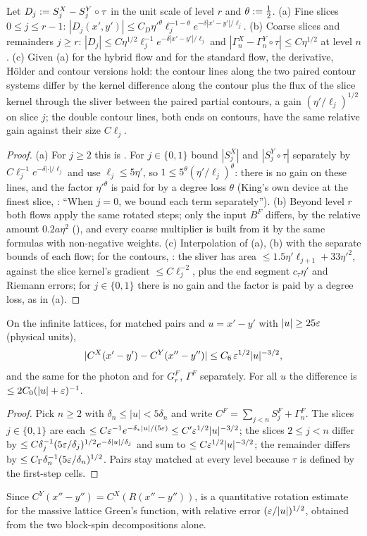 \begin{corollary}\label{rot:cor:unif}
Let $D_j:= S^X_j-S^Y_j\circ\tau$ in the unit scale of level $r$ and $\theta:=\frac12$. \textup{(a)} Fine slices $0\le j\le r-1$: $|D_j(x',y')|\le C_D\eta'^{\theta}\ell_j^{-1-\theta}e^{-\delta|x'-y'|/\ell_j}$. \textup{(b)} Coarse slices and remainders $j\ge r$: $|D_j|\le C\eta^{1/2}\ell_j^{-1}e^{-\delta|x'-y'|/\ell_j}$ and $|\Gamma^X_n-\Gamma^Y_n\circ\tau|\le C\eta^{1/2}$ at level $n$. \textup{(c)} Given (a) for the hybrid flow and \cite[Thm.~3.3]{K1} for the standard flow, the derivative, H\"older and contour versions hold: the contour lines \cite[(3.27)]{K1} along the two paired contour systems differ by the kernel difference along the contour plus the flux of the slice kernel through the sliver between the paired partial contours, a gain $(\eta'/\ell_j)^{1/2}$ on slice $j$; the double contour lines, both ends on contours, have the same relative gain against their size $C\ell_j$.
\end{corollary}
\begin{proof}
(a) For $j\ge2$ this is . For $j\in\{0,1\}$ bound $|S^X_j|$ and $|S^Y_j\circ\tau|$ separately by $C\ell_j^{-1}e^{-\delta|\cdot|/\ell_j}$ and use $\ell_j\le5\eta'$, so $1\le5^\theta(\eta'/\ell_j)^\theta$: there is no gain on these lines, and the factor $\eta'^\theta$ is paid for by a degree loss $\theta$ (King's own device at the finest slice, \cite[p.~675]{K1}: ``When $j=0$, we bound each term separately''). (b) Beyond level $r$ both flows apply the same rotated steps; only the input $B^F$ differs, by the relative amount $0.2a\eta^2$ (), and every coarse multiplier is built from it by the same formulas with non-negative weights. (c) Interpolation of (a), (b) with the separate bounds of each flow; for the contours, : the sliver has area $\le1.5\eta'\ell_{j+1}+33\eta'^2$, against the slice kernel's gradient $\le C\ell_j^{-2}$, plus the end segment $c_\tau\eta'$ and Riemann errors; for $j\in\{0,1\}$ there is no gain and the factor is paid by a degree loss, as in (a).
\end{proof}

\begin{corollary}\label{rot:cor:C}
On the infinite lattices, for matched pairs and $u=x'-y'$ with $|u|\ge25\varepsilon$ (physical units),
\[
|C^X(x'-y')-C^Y(x''-y'')|\le C_6\,\varepsilon^{1/2}|u|^{-3/2},
\]
and the same for the photon and for $G^F_r$, $\Gamma^F$ separately. For all $u$ the difference is $\le2C_0(|u|+\varepsilon)^{-1}$.
\end{corollary}
\begin{proof}
Pick $n\ge2$ with $\delta_n\le|u|<5\delta_n$ and write $C^F=\sum_{j<n}S^F_j+\Gamma^F_n$. The slices $j\in\{0,1\}$ are each $\le C\varepsilon^{-1}e^{-\delta_*|u|/(5\varepsilon)}\le C'\varepsilon^{1/2}|u|^{-3/2}$; the slices $2\le j<n$ differ by $\le C\delta_j^{-1}(5\varepsilon/\delta_j)^{1/2}e^{-\delta|u|/\delta_j}$ and sum to $\le C\varepsilon^{1/2}|u|^{-3/2}$; the remainder differs by $\le C_\Gamma\delta_n^{-1}(5\varepsilon/\delta_n)^{1/2}$. Pairs stay matched at every level because $\tau$ is defined by the first-step cells.
\end{proof}

Since $C^Y(x''-y'')=C^X(R(x''-y''))$,  is a quantitative rotation estimate for the massive lattice Green's function, with relative error $(\varepsilon/|u|)^{1/2}$, obtained from the two block-spin decompositions alone.
